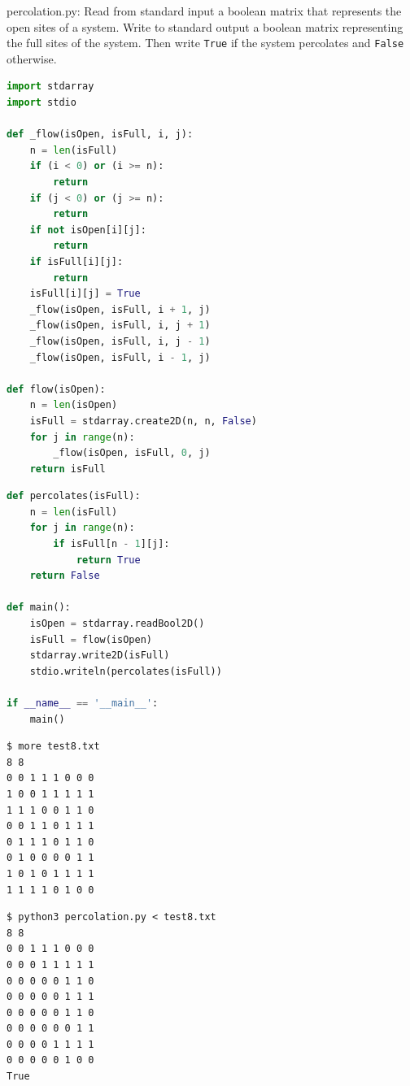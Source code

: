 \documentclass[8pt,a4paper,compress]{beamer}
\begin{document}
\begin{frame}[fragile]
\pause

\begin{framed}
\tiny percolation.py: Read from standard input a boolean matrix that represents the open sites of a system. Write to standard output a boolean matrix representing the full sites of the system. Then write \lstinline{True} if the system percolates and \lstinline{False} otherwise.

\end{framed}

\begin{lstlisting}[language=Python,style=focusin]
import stdarray
import stdio

def _flow(isOpen, isFull, i, j):
    n = len(isFull)
    if (i < 0) or (i >= n):
        return
    if (j < 0) or (j >= n):
        return
    if not isOpen[i][j]:
        return
    if isFull[i][j]:
        return
    isFull[i][j] = True
    _flow(isOpen, isFull, i + 1, j)
    _flow(isOpen, isFull, i, j + 1)
    _flow(isOpen, isFull, i, j - 1)
    _flow(isOpen, isFull, i - 1, j)

def flow(isOpen):
    n = len(isOpen)
    isFull = stdarray.create2D(n, n, False)
    for j in range(n):
        _flow(isOpen, isFull, 0, j)
    return isFull
\end{lstlisting}
\end{frame}

\begin{frame}[fragile]
\pause

\begin{lstlisting}[language=Python,style=focusin]
def percolates(isFull):
    n = len(isFull)
    for j in range(n):
        if isFull[n - 1][j]:
            return True
    return False

def main():
    isOpen = stdarray.readBool2D()
    isFull = flow(isOpen)
    stdarray.write2D(isFull)
    stdio.writeln(percolates(isFull))

if __name__ == '__main__':
    main()
\end{lstlisting}
\end{frame}

\begin{frame}[fragile]
\pause

\begin{lstlisting}[language={},style=focusin]
$ more test8.txt 
8 8
0 0 1 1 1 0 0 0
1 0 0 1 1 1 1 1
1 1 1 0 0 1 1 0
0 0 1 1 0 1 1 1
0 1 1 1 0 1 1 0
0 1 0 0 0 0 1 1
1 0 1 0 1 1 1 1
1 1 1 1 0 1 0 0
\end{lstlisting}

\pause

\begin{lstlisting}[language={},style=focusin]
$ python3 percolation.py < test8.txt 
8 8
0 0 1 1 1 0 0 0 
0 0 0 1 1 1 1 1 
0 0 0 0 0 1 1 0 
0 0 0 0 0 1 1 1 
0 0 0 0 0 1 1 0 
0 0 0 0 0 0 1 1 
0 0 0 0 1 1 1 1 
0 0 0 0 0 1 0 0 
True
\end{lstlisting}
\end{frame}
\end{document}

